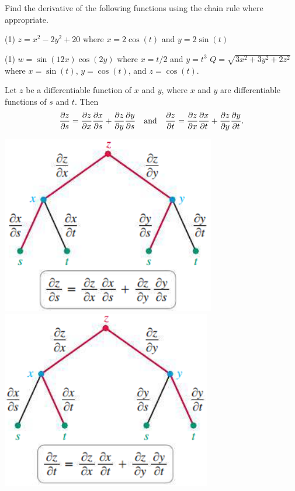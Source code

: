 \documentclass[../mathNotesPreamble]{subfiles}
\begin{document}
  \begin{ex*}
    Find the derivative of the following functions using the chain rule where appropriate.
  \end{ex*}
  \begin{tasks}[after-item-skip=\stretch{1}, label=](1)
    \task $z=x^2-2y^2+20$ where $x=2\cos(t)$ and $y=2\sin(t)$
  \end{tasks}
  \pagebreak
  \begin{tasks}[after-item-skip=\stretch{1}, label=, resume](1)
    \task $w=\sin(12x)\cos(2y)$ where $x=t/2$ and $y=t^3$
    \task $Q=\sqrt{3x^2+3y^2+2z^2}$ where $x=\sin(t)$, $y=\cos(t)$, and $z=\cos(t)$.
  \end{tasks}
  \pagebreak

  \begin{thmBox*}
    Let $z$ be a differentiable function of $x$ and $y$, where $x$ and $y$ are differentiable functions of $s$ and $t$. Then
      \[\frac{\partial z}{\partial s}=\frac{\partial z}{\partial x}\frac{\partial x}{\partial s}+\frac{\partial z}{\partial y}\frac{\partial y}{\partial s} \quad\textnormal{and}\quad \frac{\partial z}{\partial t}=\frac{\partial z}{\partial x}\frac{\partial x}{\partial t}+\frac{\partial z}{\partial y}\frac{\partial y}{\partial t}.\]
  \end{thmBox*}

  \begin{center}
    \includegraphics[width=0.315\linewidth]{../images/briggs_15_04/fig15_39}
    \includegraphics[width=0.315\linewidth, trim={0mm 1.0mm 0mm 0mm},clip]{../images/briggs_15_04/fig15_40}
  \end{center}
\end{document}
